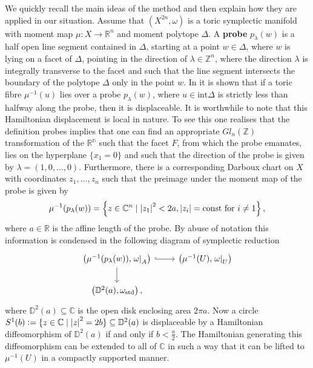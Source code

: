 \documentclass[12pt,a4paper,draft]{scrartcl}
\begin{document}
We quickly recall the main ideas of the method and then explain how they are applied in our situation.
Assume that $(X^{2n},\omega)$ is a toric symplectic manifold with moment map $μ \colon X → ℝ^n$ and moment polytope $\Delta$.
A \textbf{probe} $p_\lambda(w)$ is a half open line segment contained in $\Delta$, starting at a point $w \in \Delta$, where $w$ is lying on a facet of $\Delta$, pointing in the direction of $\lambda \in ℤ^n$, where the direction  $\lambda$ is integrally transverse to the facet and such that the line segment intersects the boundary of the polytope $\Delta$ only in the point $w$.
In \cite[Lemma 2.4.]{mcduff2011displacing} it is shown that if a toric fibre $\mu^{-1}(u)$ lies over a probe $p_\lambda(w)$, where $u\in \text{int}\Delta$ is strictly less than halfway along the probe, then it is displaceable.
It is worthwhile to note that this Hamiltonian displacement is local in nature.
To see this one realises that the definition probes implies that one can find an appropriate $Gl_n(\mathbb{Z})$ transformation of the $\mathbb{R^n}$ such that the facet $F$, from which the probe emanates, lies on the hyperplane $\{x_1=0\}$ and such that the direction of the probe is given by $\lambda=(1,0,\ldots,0)$.
Furthermore, there is a corresponding Darboux chart on $X$ with coordinates $z_1,\ldots,z_n$ such that the preimage under the moment map of the probe is given by
\begin{equation*}
  \mu^{-1}(p_\lambda(w))=\left\{z\in \mathbb{C}^n \mid \abs{z_1}^2<2a, \abs{z_i}=\text{const for }i\neq 1\right\},
\end{equation*}
where $a \in \mathbb{R}$ is the affine length of the probe.
By abuse of notation this information is condensed in the following diagram of symplectic reduction
\[
\begin{tikzcd}
  \left(\mu^{-1}(p_\lambda(w)),\left.\omega\right|_A\right)\ar[r,hook]\ar[d]&
  \left(\mu^{-1}(U),\left.\omega\right|_U\right)
  \\
  \left(\mathbb{D}^2(a),\omega_\text{std}\right),
\end{tikzcd}
\]
where $\mathbb{D}^2(a)\subseteq \mathbb{C}$ is the open disk enclosing area $2\pi a$.
Now a circle $S^1(b)\vcentcolon=\{z\in \mathbb{C}\mid \abs{z}^2=2b\} \subseteq \mathbb{D}^2(a)$ is displaceable by a Hamiltonian diffeomorphism of $\mathbb{D}^2(a)$ if and only if $b<\frac{a}{2}$.
The Hamiltonian generating this diffeomorphism can be extended to all of $\mathbb{C}$ in such a way that it can be lifted to $\mu^{-1}(U)$ in a compactly supported manner.
\end{document}
